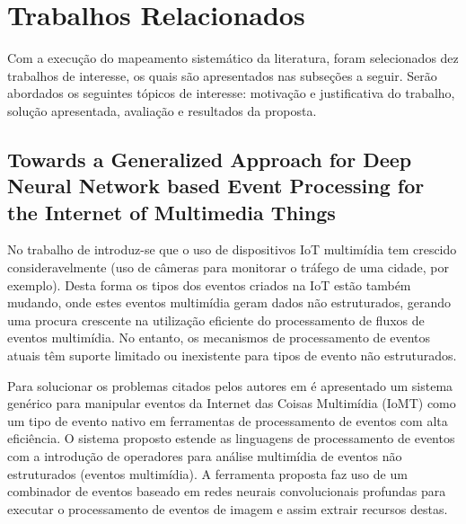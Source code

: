 \documentclass[ti,table]{texufpel} %
\begin{document}
  

  

\section{Trabalhos Relacionados} 

Com a execução do mapeamento sistemático da literatura, foram selecionados dez trabalhos de interesse, os quais são apresentados nas subseções a seguir. Serão abordados os seguintes tópicos de interesse: motivação e justificativa do trabalho, solução apresentada, avaliação e resultados da proposta. 

  

  


\subsection{Towards a Generalized Approach for Deep Neural Network based Event Processing for the Internet of Multimedia Things} 

  

  

    No trabalho de \cite{art1aslam2018towards} introduz-se que o uso de dispositivos IoT multimídia tem crescido consideravelmente (uso de câmeras para monitorar o tráfego de uma cidade, por exemplo). Desta forma os tipos dos eventos criados na IoT estão também mudando, onde estes eventos multimídia geram dados não estruturados, gerando uma procura crescente na utilização eficiente do processamento de fluxos de eventos multimídia. No entanto, os mecanismos de processamento de eventos atuais têm suporte limitado ou inexistente para tipos de evento não estruturados. 

     

    Para solucionar os problemas citados pelos autores em \cite{art1aslam2018towards} é apresentado um sistema genérico para manipular eventos da Internet das Coisas Multimídia (IoMT) como um tipo de evento nativo em ferramentas de processamento de eventos com alta eficiência. O sistema proposto estende as linguagens de processamento de eventos com a introdução de operadores para análise multimídia de eventos não estruturados (eventos multimídia). A ferramenta proposta faz uso de um combinador de eventos baseado em redes neurais convolucionais profundas para executar o processamento de eventos de imagem e assim extrair recursos destas. 
\end{document}
